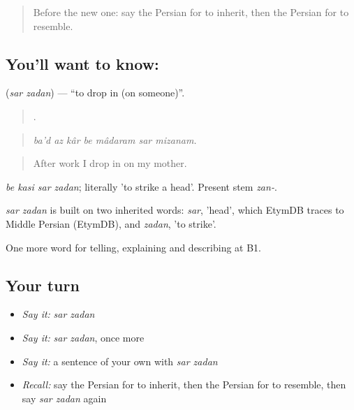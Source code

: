 \label{lesson:FA-C506-sar-zadan}



\begin{quote}
Before the new one: say the Persian for to inherit, then the Persian for to resemble.
\end{quote}

\subsection*{You'll want to know:  }
\textbf{ } (\emph{sar zadan}) — \textquotedblleft{}to drop in (on someone)\textquotedblright{}.

\begin{quote}
      .
\end{quote}

\begin{quote}
\emph{ba'd az kâr be mâdaram sar mizanam.}
\end{quote}

\begin{quote}
After work I drop in on my mother.
\end{quote}

\emph{be kasi sar zadan}; literally 'to strike a head'. Present stem \emph{zan-}.

\begin{cousinweb}
\emph{sar zadan} is built on two inherited words: \emph{sar}, 'head', which EtymDB traces to Middle Persian (EtymDB), and \emph{zadan}, 'to strike'.
\end{cousinweb}

\begin{grammarlens}[title={What you've built}]
One more word for telling, explaining and describing at B1.
\end{grammarlens}

\subsection*{Your turn}
\begin{itemize}
\raggedright
  \item \emph{Say it:} \emph{sar zadan}
  \item \emph{Say it:} \emph{sar zadan}, once more
  \item \emph{Say it:} a sentence of your own with \emph{sar zadan}
  \item \emph{Recall:} say the Persian for to inherit, then the Persian for to resemble, then say \emph{sar zadan} again
\end{itemize}

